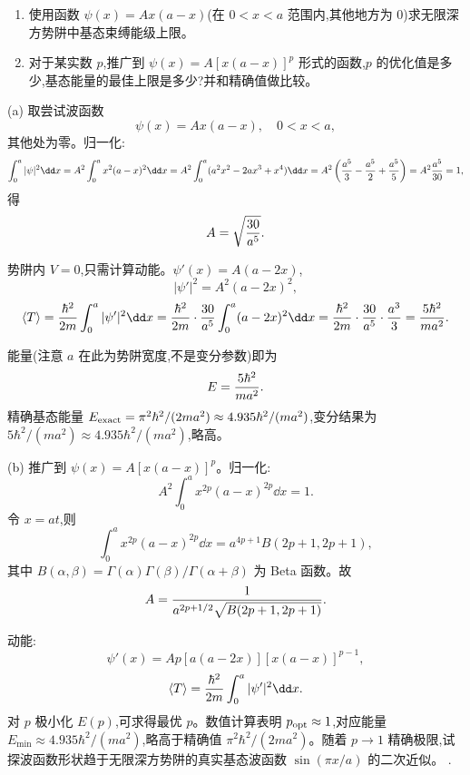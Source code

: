 \begin{question}
\begin{enumerate}
\item 使用函数 $\psi(x)=Ax(a-x)$(在 $0<x<a$ 范围内,其他地方为 0)求无限深方势阱中基态束缚能级上限。
\item 对于某实数 $p$,推广到 $\psi(x)=A[x(a-x)]^p$ 形式的函数,$p$ 的优化值是多少,基态能量的最佳上限是多少?并和精确值做比较。
\end{enumerate}
\end{question}
\begin{solution}
(a) 取尝试波函数
\[
\psi(x)=A x(a-x),\quad 0<x<a,
\]
其他处为零。归一化:
\[
\int_0^a|\psi|^2\dd x=A^2\int_0^a x^2(a-x)^2\dd x
=A^2\int_0^a (a^2x^2-2ax^3+x^4)\dd x
=A^2\left({a^5\over3}-{a^5\over2}+{a^5\over5}\right)
=A^2{a^5\over30}=1,
\]
得
\[
A=\sqrt{30\over a^5}.
\]

势阱内 $V=0$,只需计算动能。$\psi'(x)=A(a-2x)$,
\[
|\psi'|^2=A^2(a-2x)^2,
\]
\[
\langle T\rangle={\hbar^2\over2m}\int_0^a|\psi'|^2\dd x
={\hbar^2\over2m}\cdot{30\over a^5}\int_0^a (a-2x)^2\dd x
={\hbar^2\over2m}\cdot{30\over a^5}\cdot{a^3\over3}
={5\hbar^2\over ma^2}.
\]

能量(注意 $a$ 在此为势阱宽度,不是变分参数)即为
\[
E={5\hbar^2\over ma^2}.
\]
精确基态能量 $E_{\rm exact}=\pi^2\hbar^2/(2ma^2)\approx4.935\hbar^2/(ma^2)$,变分结果为 $5\hbar^2/(ma^2)\approx4.935\hbar^2/(ma^2)$,略高。

(b) 推广到 $\psi(x)=A[x(a-x)]^p$。归一化:
\[
A^2\int_0^a x^{2p}(a-x)^{2p}\dd x=1.
\]
令 $x=at$,则
\[
\int_0^a x^{2p}(a-x)^{2p}\dd x=a^{4p+1}B(2p+1,2p+1),
\]
其中 $B(\alpha,\beta)=\Gamma(\alpha)\Gamma(\beta)/\Gamma(\alpha+\beta)$ 为 Beta 函数。故
\[
A={1\over a^{2p+1/2}\sqrt{B(2p+1,2p+1)}}.
\]

动能:
\[
\psi'(x)=Ap[a(a-2x)][x(a-x)]^{p-1},
\]
\[
\langle T\rangle={\hbar^2\over2m}\int_0^a|\psi'|^2\dd x.
\]
对 $p$ 极小化 $E(p)$,可求得最优 $p$。数值计算表明 $p_{\rm opt}\approx1$,对应能量 $E_{\min}\approx4.935\hbar^2/(ma^2)$,略高于精确值 $\pi^2\hbar^2/(2ma^2)$。随着 $p\to1$ 精确极限,试探波函数形状趋于无限深方势阱的真实基态波函数 $\sin(\pi x/a)$ 的二次近似。
.
\end{solution}

